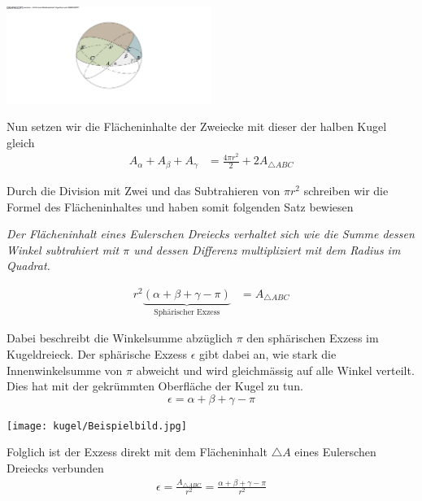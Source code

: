 \begin{refsection}
\begin{center}
        \includegraphics[width=0.5\textwidth]{kugel/1HalbeKugel.jpg}
\end{center}

Nun setzen wir die Flächeninhalte der Zweiecke mit dieser der halben Kugel gleich
\begin{align*}
A_{ \alpha } + A_{ \beta } + A_{ \gamma } &= \frac{ 4\pi r^{ 2 } }{ 2 } + 2A_{ \triangle{ ABC }}
\end{align*}

Durch die Division mit Zwei und das Subtrahieren von $\pi r^2$ schreiben wir die Formel des Flächeninhaltes und haben somit folgenden Satz bewiesen
\begin{satz} \textit{Der Flächeninhalt eines Eulerschen Dreiecks verhaltet sich wie die Summe dessen Winkel subtrahiert mit $\pi$ und dessen Differenz multipliziert mit dem Radius im Quadrat.}
\label{skript:kugel:satz:Flaecheninhalt}
\end{satz}

\begin{align*}
r^{ 2 }\underbrace{(\alpha + \beta + \gamma - \pi)}_{\text{Sphärischer Exzess}} &= A_{ \triangle{ ABC }}  
\end{align*}

Dabei beschreibt die Winkelsumme abzüglich $\pi$ den sphärischen Exzess im Kugeldreieck.
Der sphärische Exzess $\epsilon$ gibt dabei an, wie stark die Innenwinkelsumme von $\pi$ abweicht und wird gleichmässig auf alle Winkel verteilt. Dies hat mit der gekrümmten Oberfläche der Kugel zu tun.
\begin{equation}
\epsilon = \alpha + \beta + \gamma - \pi
\end{equation}

\begin{center}
        \texttt{[image: kugel/Beispielbild.jpg]}
\end{center}

Folglich ist der Exzess direkt mit dem Flächeninhalt $\triangle A$ eines Eulerschen Dreiecks verbunden
\begin{align*}
\epsilon =\frac{A_{\triangle{ ABC }}}{r^2} = \frac{\alpha + \beta + \gamma - \pi}{r^2}
\end{align*}


\end{refsection}
